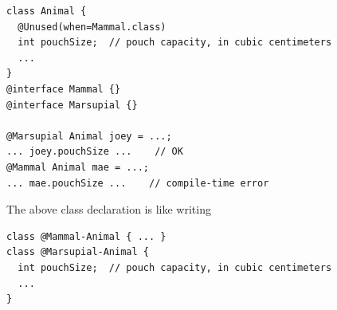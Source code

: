 \begin{Verbatim}
class Animal {
  @Unused(when=Mammal.class)
  int pouchSize;  // pouch capacity, in cubic centimeters
  ...
}
@interface Mammal {}
@interface Marsupial {}

@Marsupial Animal joey = ...;
... joey.pouchSize ...    // OK
@Mammal Animal mae = ...;
... mae.pouchSize ...    // compile-time error
\end{Verbatim}

The above class declaration is like writing

\begin{Verbatim}
class @Mammal-Animal { ... }
class @Marsupial-Animal {
  int pouchSize;  // pouch capacity, in cubic centimeters
  ...
}
\end{Verbatim}


%
%
%
%
%
%
%
